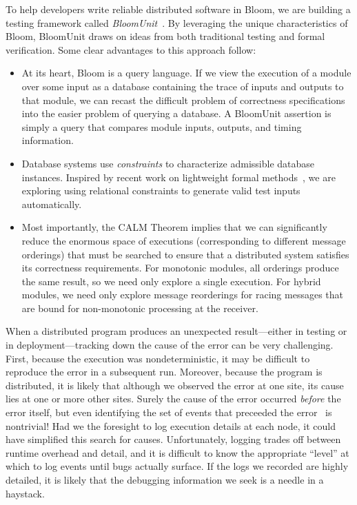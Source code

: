To help developers write reliable distributed software in Bloom, we are building
a testing framework called \emph{BloomUnit}~\cite{Alvaro2012}. By leveraging the
unique characteristics of Bloom, BloomUnit draws on ideas from both traditional
testing and formal verification. Some clear advantages to this approach follow:

\begin{itemize}
\item
  At its heart, Bloom is a query language.  If we view the execution of a module
  over some input as a database containing the trace of inputs and outputs to
  that module, we can recast the difficult problem of correctness specifications
  into the easier problem of querying a database. A BloomUnit assertion is
  simply a query that compares module inputs, outputs, and timing information.

\item
  Database systems use \emph{constraints} to characterize admissible database
  instances.  Inspired by recent work on lightweight formal
  methods~\cite{Jackson2012}, we are exploring using relational constraints to
  generate valid test inputs automatically.

\item
  Most importantly, the CALM Theorem implies that we can significantly reduce
  the enormous space of executions (corresponding to different message
  orderings) that must be searched to ensure that a distributed system satisfies
  its correctness requirements.  For monotonic modules, all orderings produce
  the same result, so we need only explore a single execution.  For hybrid
  modules, we need only explore message reorderings for racing messages that are
  bound for non-monotonic processing at the receiver.
\end{itemize}

When a distributed program produces an unexpected result---either in testing or in
deployment---tracking down the cause of the error can be very challenging.  First, because
the execution was nondeterministic, it may be difficult to reproduce the error in a subsequent
run.  Moreover, because the program is distributed, it is likely that although we observed the 
error at one site, its cause lies at one or more other sites.  Surely the cause of the error
occurred \emph{before} the error itself, but even identifying the set of events that preceeded the 
error~\cite{lamport} is nontrivial!  Had we the foresight to log execution details at each node,
it could have simplified this search for causes.  Unfortunately, logging trades off between 
runtime overhead and detail, and it is difficult to know the appropriate ``level'' at which to
log events until bugs actually surface.  If the logs we recorded are highly detailed, it is likely
that the debugging information we seek is a needle in a haystack.

